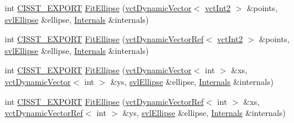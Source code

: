 \begin{DoxyCompactItemize}
\item 
int \hyperlink{cmn_export_macros_8h_a99393e0c3ac434b2605235bbe20684f8}{C\-I\-S\-S\-T\-\_\-\-E\-X\-P\-O\-R\-T} \hyperlink{namespacesvl_image_processing_a4a85afa0bb53375e699868c357452543}{Fit\-Ellipse} (\hyperlink{classvct_dynamic_vector}{vct\-Dynamic\-Vector}$<$ \hyperlink{vct_fixed_size_vector_types_8h_add8c88eb6a432b15f14b866b9c35325f}{vct\-Int2} $>$ \&points, \hyperlink{structsvl_ellipse}{svl\-Ellipse} \&ellipse, \hyperlink{classsvl_image_processing_1_1_internals}{Internals} \&internals)
\item 
int \hyperlink{cmn_export_macros_8h_a99393e0c3ac434b2605235bbe20684f8}{C\-I\-S\-S\-T\-\_\-\-E\-X\-P\-O\-R\-T} \hyperlink{namespacesvl_image_processing_aad9cc4e49aa720ddcee41baf824d9f23}{Fit\-Ellipse} (\hyperlink{classvct_dynamic_vector_ref}{vct\-Dynamic\-Vector\-Ref}$<$ \hyperlink{vct_fixed_size_vector_types_8h_add8c88eb6a432b15f14b866b9c35325f}{vct\-Int2} $>$ \&points, \hyperlink{structsvl_ellipse}{svl\-Ellipse} \&ellipse, \hyperlink{classsvl_image_processing_1_1_internals}{Internals} \&internals)
\item 
int \hyperlink{cmn_export_macros_8h_a99393e0c3ac434b2605235bbe20684f8}{C\-I\-S\-S\-T\-\_\-\-E\-X\-P\-O\-R\-T} \hyperlink{namespacesvl_image_processing_acfdf5370aa634ba4667c30c3bcde4d38}{Fit\-Ellipse} (\hyperlink{classvct_dynamic_vector}{vct\-Dynamic\-Vector}$<$ int $>$ \&xs, \hyperlink{classvct_dynamic_vector}{vct\-Dynamic\-Vector}$<$ int $>$ \&ys, \hyperlink{structsvl_ellipse}{svl\-Ellipse} \&ellipse, \hyperlink{classsvl_image_processing_1_1_internals}{Internals} \&internals)
\item 
int \hyperlink{cmn_export_macros_8h_a99393e0c3ac434b2605235bbe20684f8}{C\-I\-S\-S\-T\-\_\-\-E\-X\-P\-O\-R\-T} \hyperlink{namespacesvl_image_processing_a78eee24a87a52ecc83dc9e68f8b68d9c}{Fit\-Ellipse} (\hyperlink{classvct_dynamic_vector_ref}{vct\-Dynamic\-Vector\-Ref}$<$ int $>$ \&xs, \hyperlink{classvct_dynamic_vector_ref}{vct\-Dynamic\-Vector\-Ref}$<$ int $>$ \&ys, \hyperlink{structsvl_ellipse}{svl\-Ellipse} \&ellipse, \hyperlink{classsvl_image_processing_1_1_internals}{Internals} \&internals)
\end{DoxyCompactItemize}



